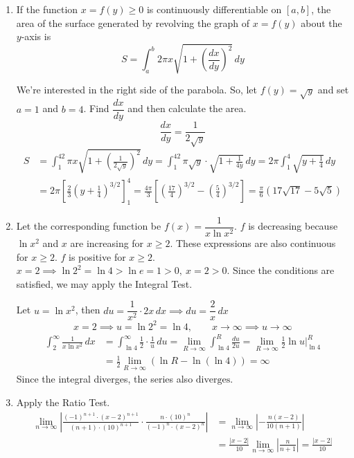 \documentclass[a4paper, 12pt]{article}
\begin{document}
\begin{enumerate}[leftmargin=*,label=\textbf{\arabic*.}]
\item If the function $x=f(y)\geq0$ is continuously differentiable on $[a,b]$, the area of the surface generated by revolving the graph of $x=f(y)$ about the $y$-axis is
\[S=\int_a^b2\pi x\sqrt{1+\left(\frac{dx}{dy}\right)^2}\,dy\]

We're interested in the right side of the parabola. So, let $f(y)=\sqrt{y}$ and set $a=1$ and $b=4$. Find $\dfrac{dx}{dy}$ and then calculate the area.
\[\frac{dx}{dy}=\frac1{2\sqrt y}\]
\begin{align*}S&=\int_1^42\pi x\sqrt{1+\left(\frac1{2\sqrt y}\right)^2}\,dy=\int_1^42\pi\sqrt y\cdot\sqrt{1+\frac1{4y}}\,dy=2\pi\int_1^4\sqrt{y+\frac14}\,dy\\[1em]&=2\pi\left[\frac23\left(y+\frac14\right)^{3/2}\right]_1^4=\frac{4\pi}3\left[\left(\frac{17}4\right)^{3/2}-\left(\frac54\right)^{3/2}\right]=\boxed{\frac\pi6\left(17\sqrt{17}-5\sqrt5\right)}\end{align*}

\item Let the corresponding function be $f(x)=\dfrac1{x\ln x^2}$. $f$ is decreasing because $\ln x^2$ and $x$ are increasing for $x\geq2$. These expressions are also continuous for $x\geq2$. $f$ is positive for $x\geq2$. $x=2\implies\ln2^2=\ln4>\ln e=1>0,\: x=2>0$. Since the conditions are satisfied, we may apply the Integral Test.

Let $u=\ln x^2$, then $du=\dfrac1{x^2}\cdot 2x\,dx\implies du=\dfrac2x\,dx$
\[x=2\implies u=\ln2^2=\ln4,\qquad x\to\infty\implies u\to\infty\]
\begin{align*}\int_2^{\infty}\frac1{x\ln x^2}\,dx&=\int_{\ln 4}^{\infty}\frac12\cdot\frac1{u}\,du=\lim_{R\to\infty}\int_{\ln4}^R\frac{du}{2u}=\lim_{R\to\infty}\frac12\ln u\bigg|_{\ln4}^R\\[1em]&=\frac12\lim_{R\to\infty}\left(\ln R-\ln(\ln 4)\right)=\boxed{\infty}\end{align*}
Since the integral diverges, the series also $\boxed{\text{diverges}}$.

\newpage
\item Apply the Ratio Test.
\begin{align*}
\lim_{n\to\infty}\left|\frac{(-1)^{n+1}\cdot(x-2)^{n+1}}{(n+1)\cdot(10)^{n+1}}\cdot\frac{n\cdot(10)^n}{(-1)^n\cdot(x-2)^n}\right|&=\lim_{n\to\infty}\left|-\frac{n(x-2)}{10(n+1)}\right|\\[1em]&=\frac{|x-2|}{10}\lim_{n\to\infty}\left|\frac n{n+1}\right|=\frac{|x-2|}{10}
\end{align*}


\end{enumerate}
\end{document}
